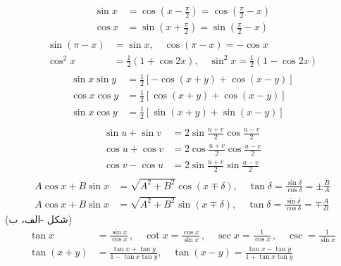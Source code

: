 %
\begin{gather}
\begin{aligned}
\sin x&=\cos\left(x-\frac{\pi}{2}\right)=\cos\left(\frac{\pi}{2}-x\right)\\
\cos x&=\sin\left(x+\frac{\pi}{2}\right)=\sin\left(\frac{\pi}{2}-x\right)
\end{aligned}
\end{gather}
%
\begin{align}
\sin(\pi-x)&=\sin x,\quad \cos(\pi-x)=-\cos x\\
\cos^2x&=\frac{1}{2}(1+\cos 2x),\quad \sin^2x=\frac{1}{2}(1-\cos 2x)
\end{align}
%
\begin{gather}
\begin{aligned}\label{مساوات_ضمیمہ_مفید_گیارہ}
\sin x\sin y&=\frac{1}{2}[-\cos(x+y)+\cos(x-y)]\\
\cos x\cos y&=\frac{1}{2}[\cos(x+y)+\cos(x-y)]\\
\sin x\cos y&=\frac{1}{2}[\sin(x+y)+\sin(x-y)]
\end{aligned}
\end{gather}
%
\begin{gather}
\begin{aligned}
\sin u+\sin v&=2\sin \frac{u+v}{2}\cos\frac{u-v}{2}\\
\cos u+\cos v&=2\cos\frac{u+v}{2}\cos\frac{u-v}{2}\\
\cos v-\cos u&=2\sin\frac{u+v}{2}\sin\frac{u-v}{2}
\end{aligned}
\end{gather}
%
\begin{align}
A\cos x+B\sin x&=\sqrt{A^2+B^2}\cos(x\mp\delta),\quad \tan \delta=\frac{\sin \delta}{\cos \delta}=\pm \frac{B}{A}\\
A\cos x+B\sin x &=\sqrt{A^2+B^2}\sin(x\mp\delta),\quad \tan \delta=\frac{\sin \delta}{\cos \delta}=\mp\frac{A}{B}
\end{align}
 (شکل -الف، ب)
\begin{align}
\tan x&=\frac{\sin x}{\cos x}\, ,\quad \cot x=\frac{\cos x}{\sin x}\, ,\quad \sec x=\frac{1}{\cos x}\, ,\quad \csc=\frac{1}{\sin x}\\
\tan(x+y)&=\frac{\tan x+\tan y}{1-\tan x\tan y},\quad \tan(x-y)=\frac{\tan x-\tan y}{1+\tan x\tan y}
\end{align}
%
